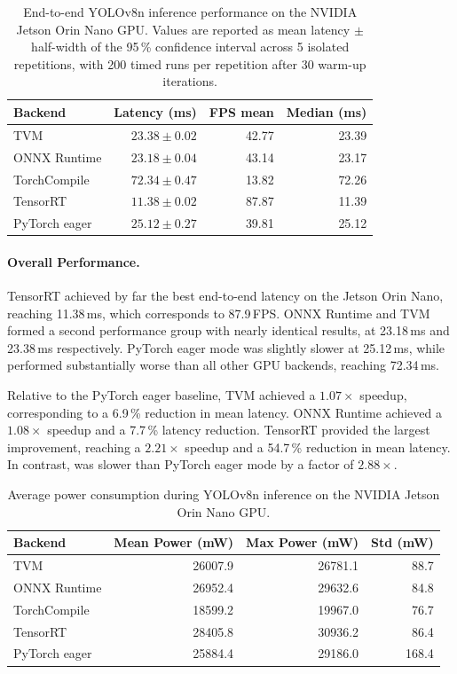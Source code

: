 \documentclass[12pt,a4paper]{report}
\begin{document}
\begin{table}[ht]
\centering
\caption{End-to-end YOLOv8n inference performance on the NVIDIA Jetson Orin Nano GPU.
Values are reported as mean latency $\pm$ half-width of the 95\,\% confidence
interval across 5 isolated repetitions, with 200 timed runs per repetition
after 30 warm-up iterations.}
\label{tab:orin_backend_benchmark}
\begin{tabular}{lrrr}
\toprule
Backend & Latency (ms) & FPS mean & Median (ms) \\
\midrule
TVM             & $23.38 \pm 0.02$ & 42.77 & 23.39 \\
ONNX Runtime    & $23.18 \pm 0.04$ & 43.14 & 23.17 \\
TorchCompile    & $72.34 \pm 0.47$ & 13.82 & 72.26 \\
TensorRT        & $11.38 \pm 0.02$ & 87.87 & 11.39 \\
PyTorch eager   & $25.12 \pm 0.27$ & 39.81 & 25.12 \\
\bottomrule
\end{tabular}
\end{table}

\paragraph{Overall Performance.}
TensorRT achieved by far the best end-to-end latency on the Jetson Orin Nano,
reaching 11.38\,ms, which corresponds to 87.9\,FPS. ONNX Runtime and TVM
formed a second performance group with nearly identical results, at 23.18\,ms
and 23.38\,ms respectively. PyTorch eager mode was slightly slower at
25.12\,ms, while  performed substantially worse than all
other GPU backends, reaching 72.34\,ms.

Relative to the PyTorch eager baseline, TVM achieved a \(1.07\times\) speedup,
corresponding to a 6.9\,\% reduction in mean latency. ONNX Runtime achieved a
\(1.08\times\) speedup and a 7.7\,\% latency reduction. TensorRT provided the
largest improvement, reaching a \(2.21\times\) speedup and a 54.7\,\%
reduction in mean latency. In contrast,  was slower than
PyTorch eager mode by a factor of \(2.88\times\).

\begin{table}[ht]
\centering
\caption{Average power consumption during YOLOv8n inference on the NVIDIA Jetson
Orin Nano GPU.}
\label{tab:orin_backend_power}
\begin{tabular}{lrrr}
\toprule
Backend & Mean Power (mW) & Max Power (mW) & Std (mW) \\
\midrule
TVM             & 26007.9 & 26781.1 & 88.7 \\
ONNX Runtime    & 26952.4 & 29632.6 & 84.8 \\
TorchCompile    & 18599.2 & 19967.0 & 76.7 \\
TensorRT        & 28405.8 & 30936.2 & 86.4 \\
PyTorch eager   & 25884.4 & 29186.0 & 168.4 \\
\bottomrule
\end{tabular}
\end{table}
\end{document}
